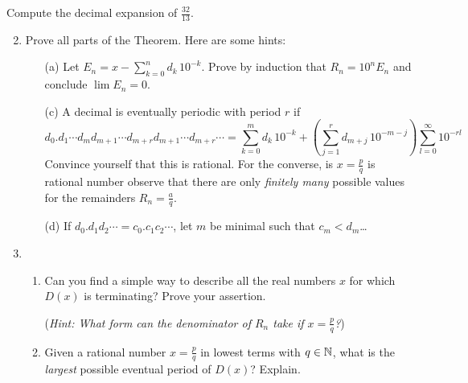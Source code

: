 \begin{exercises*}{}
	\exstart Compute the decimal expansion of $\frac{32}{13}$.
	
	\begin{enumerate}\setcounter{enumi}{1}
  	\item Prove all parts of the Theorem. Here are some hints:
		\begin{itemize}
	  	\item[(a)] Let $E_n=x-\sum\limits_{k=0}^nd_k\,10^{-k}$. Prove by induction that $R_n=10^nE_n$ and conclude $\lim E_n=0$.
	  	\item[(c)] A decimal is eventually periodic with period $r$ if
	  	\[
	  		d_0.d_1\cdots d_md_{m+1}\cdots d_{m+r}d_{m+1}\cdots d_{m+r}\cdots 
	  		=\sum_{k=0}^md_k\, 10^{-k}
	  		+\left(\sum_{j=1}^rd_{m+j}\,10^{-m-j}\right)
	  		\sum_{l=0}^\infty 10^{-rl}
	  	\]
	  	Convince yourself that this is rational. For the converse, is $x=\frac pq$ is rational number observe that there are only \emph{finitely many} possible values for the remainders $R_n=\frac aq$.
	  	\item[(d)] If $d_0.d_1d_2\cdots=c_0.c_1c_2\cdots$, let $m$ be minimal such that $c_m<d_m$\ldots
		\end{itemize}
		
	\item\begin{enumerate}
	  \item Can you find a simple way to describe all the real numbers $x$ for which $D(x)$ is terminating? Prove your assertion.\par
	  (\emph{Hint: What form can the denominator of $R_n$ take if $x=\frac pq$?})
	  
	  \item Given a rational number $x=\frac pq$ in lowest terms with $q\in\mathbb{N}$, what is the \emph{largest} possible eventual period of $D(x)$? Explain.
	\end{enumerate}
	

\end{enumerate}
\end{exercises*}
